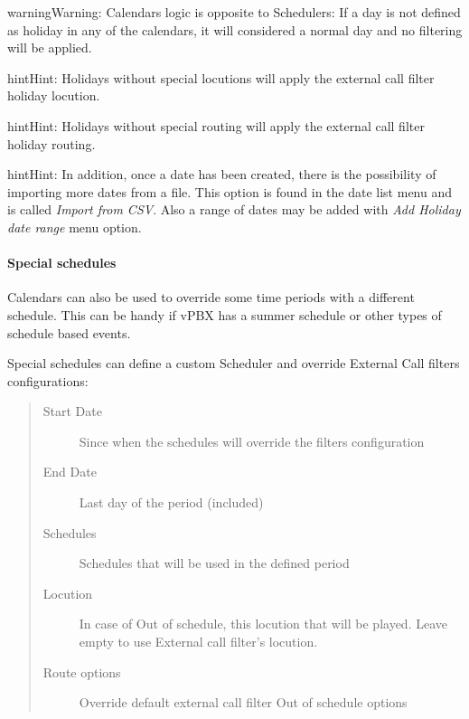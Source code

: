 \documentclass[letterpaper,10pt,english]{sphinxmanual}
\begin{document}
\begin{notice}{warning}{Warning:}
Calendars logic is opposite to Schedulers: If a day is not defined
as holiday in any of the calendars, it will considered a normal day and no
filtering will be applied.
\end{notice}

\begin{notice}{hint}{Hint:}
Holidays without special locutions will apply the external call filter
holiday locution.
\end{notice}

\begin{notice}{hint}{Hint:}
Holidays without special routing will apply the external call filter
holiday routing.
\end{notice}

\begin{notice}{hint}{Hint:}
In addition, once a date has been created, there is the possibility of
importing more dates from a file. This option is found in the date list menu and
is called \emph{Import from CSV}.
Also a range of dates may be added with \emph{Add Holiday date range} menu option.
\end{notice}


\paragraph{Special schedules}
\label{administration_portal/client/vpbx/routing_tools/calendars:id2}\label{administration_portal/client/vpbx/routing_tools/calendars:special-schedules}
Calendars can also be used to override some time periods with a different schedule.
This can be handy if vPBX has a summer schedule or other types of schedule based events.

Special schedules can define a custom Scheduler and override External Call filters configurations:
\begin{quote}
\begin{description}
\item[{Start Date}] \leavevmode
Since when the schedules will override the filters configuration

\item[{End Date}] \leavevmode
Last day of the period (included)

\item[{Schedules}] \leavevmode
Schedules that will be used in the defined period

\item[{Locution}] \leavevmode
In case of Out of schedule, this locution that will be played. Leave empty to use External
call filter's locution.

\item[{Route options}] \leavevmode
Override default external call filter Out of schedule options

\end{description}
\end{quote}
\end{document}
